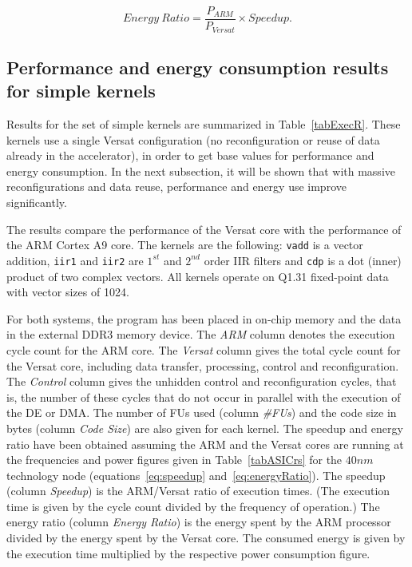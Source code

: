 \begin{equation}
Energy~Ratio = \frac{P_{ARM}}{P_{Versat}} \times Speedup.
\label{eq:energyRatio}
\end{equation}

\subsection{Performance and energy consumption results for simple kernels}
\label{subsection:ResultsSimpleKernels}

Results for the set of simple kernels are summarized in
Table~\ref{tabExecR}. These kernels use a single Versat configuration
(no reconfiguration or reuse of data already in the accelerator), in
order to get base values for performance and energy consumption. In
the next subsection, it will be shown that with massive reconfigurations
and data reuse, performance and energy use improve significantly.

The results compare the performance of the Versat core with the
performance of the ARM Cortex A9 core. The kernels are the following:
{\tt vadd} is a vector addition, {\tt iir1} and {\tt iir2} are $1^{st}$
and $2^{nd}$ order IIR filters and {\tt cdp} is a dot (inner) product of
two complex vectors. All kernels operate on Q1.31 fixed-point data
with vector sizes of 1024.

For both systems, the program has been placed in on-chip memory and
the data in the external DDR3 memory device. The {\em ARM} column
denotes the execution cycle count for the ARM core. The {\em Versat}
column gives the total cycle count for the Versat core, including data
transfer, processing, control and reconfiguration. The {\em Control}
column gives the unhidden control and reconfiguration cycles, that is,
the number of these cycles that do not occur in parallel with the
execution of the DE or DMA. The number of FUs used (column {\em
  \#FUs}) and the code size in bytes (column {\em Code Size}) are also
given for each kernel. The speedup and energy ratio have been obtained
assuming the ARM and the Versat cores are running at the frequencies
and power figures given in Table~\ref{tabASICrs} for the $40nm$
technology node (equations~\ref{eq:speedup}
and~\ref{eq:energyRatio}). The speedup (column {\em Speedup}) is the
ARM/Versat ratio of execution times. (The execution time is given by
the cycle count divided by the frequency of operation.) The energy
ratio (column {\em Energy Ratio}) is the energy spent by the ARM
processor divided by the energy spent by the Versat core. The consumed
energy is given by the execution time multiplied by the respective
power consumption figure.

